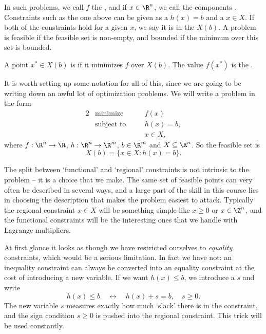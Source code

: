In such problems, we call $f$ the , and if $x \in \R^n$, we call the components . Constraints such as the one above can be given as a  $h(x) = b$ and a  $x \in X$. If both of the constraints hold for a given $x$, we say it is in the  $X(b)$. A problem is feasible if the feasible set is non-empty, and bounded if the minimum over this set is bounded.

A point $x^* \in X(b)$ is  if it minimizes $f$ over $X(b)$. The value $f(x^*)$ is the .

It is worth setting up some notation for all of this, since we are going to be writing down an awful lot of optimization problems. We will write a problem in the form
\begin{alignat*}{2}
    & \text{minimize} \quad && f(x) \\
    & \text{subject to} \quad && h(x) = b, \\
    & && x \in X,
\end{alignat*}
where $f : \R^n \rightarrow \R$, $h : \R^n \rightarrow \R^m$, $b \in \R^m$ and $X \subseteq \R^n$. So the feasible set is
$$
X(b) = \{x \in X : h(x) = b\}.
$$

\begin{remark}
    The split between `functional' and `regional' constraints is not intrinsic to the problem -- it is a choice that we make. The same set of feasible points can very often be described in several ways, and a large part of the skill in this course lies in choosing the description that makes the problem easiest to attack. Typically the regional constraint $x \in X$ will be something simple like $x \geq 0$ or $x \in \Z^n$, and the functional constraints will be the interesting ones that we handle with Lagrange multipliers.
\end{remark}

At first glance it looks as though we have restricted ourselves to \emph{equality} constraints, which would be a serious limitation. In fact we have not: an inequality constraint can always be converted into an equality constraint at the cost of introducing a new variable. If we want $h(x) \leq b$, we introduce a  $s$ and write
$$
h(x) \leq b \quad \longleftrightarrow \quad h(x) + s = b, \quad s \geq 0.
$$
The new variable $s$ measures exactly how much `slack' there is in the constraint, and the sign condition $s \geq 0$ is pushed into the regional constraint. This trick will be used constantly.

